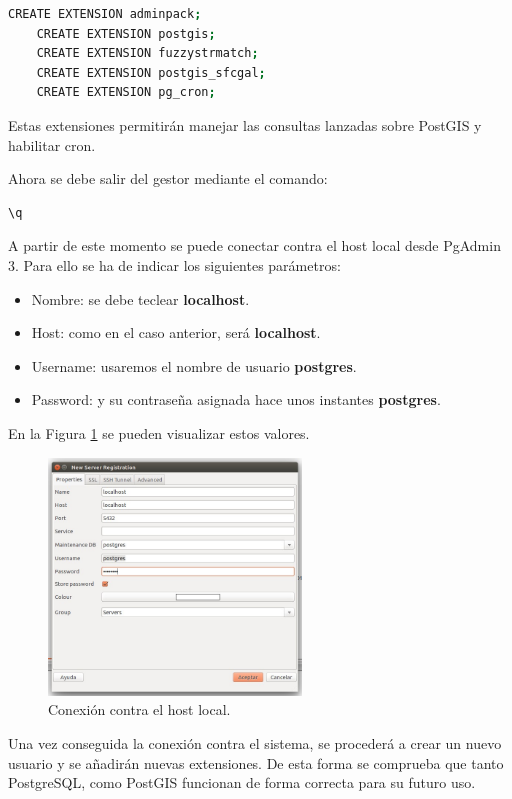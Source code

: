 \begin{lstlisting}[language=bash]
	CREATE EXTENSION adminpack;
	CREATE EXTENSION postgis;
	CREATE EXTENSION fuzzystrmatch;
	CREATE EXTENSION postgis_sfcgal;
	CREATE EXTENSION pg_cron;
\end{lstlisting}

Estas extensiones permitirán manejar las consultas lanzadas sobre PostGIS y habilitar cron.

Ahora se debe salir del gestor mediante el comando:
\begin{lstlisting}[language=bash]
	\q
\end{lstlisting}

A partir de este momento se puede conectar contra el host local desde PgAdmin 3. Para ello se ha de indicar los siguientes parámetros:

\begin{itemize}
	\item Nombre: se debe teclear \textbf{localhost}.
	\item Host: como en el caso anterior, será \textbf{localhost}.
	\item Username: usaremos el nombre de usuario \textbf{postgres}.
	\item Password: y su contraseña asignada hace unos instantes \textbf{postgres}.
\end{itemize}

En la Figura \ref{conexion} se pueden visualizar estos valores.

\begin{figure}[h]
  \centering
    \includegraphics[width=0.6\textwidth]{../img/instalacion/conexion.jpg}
  \caption{Conexión contra el host local.}
  \label{conexion}
\end{figure}

Una vez conseguida la conexión contra el sistema, se procederá a crear un nuevo usuario y se añadirán nuevas extensiones. De esta forma se comprueba que tanto PostgreSQL, como PostGIS funcionan de forma correcta para su futuro uso.

